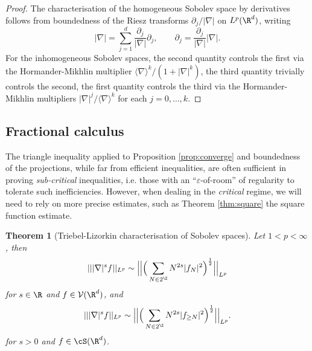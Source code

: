 \documentclass[reqno]{amsart}
\newtheorem{theorem}{Theorem}
\theoremstyle{definition}
\theoremstyle{remark}
\renewcommand{\epsilon}{\varepsilon}
\begin{document}
\begin{proof}
	The characterisation of the homogeneous Sobolev space by derivatives follows from boundedness of the Riesz transforms $\partial_j/|\nabla|$ on $L^p (\R^d)$, writing 
		\[ |\nabla| = \sum_{j = 1}^d \frac{\partial_j}{|\nabla|} \partial_j , \qquad \partial_j = \frac{\partial_j}{|\nabla|} |\nabla|. \]
	For the inhomogeneous Sobolev spaces, the second quantity controls the first via the Hormander-Mikhlin multiplier $\langle \nabla \rangle^k /(1 + |\nabla|^k)$, the third quantity trivially controls the second, the first quantity controls the third via the Hormander-Mikhlin multipliers $|\nabla|^j/\langle \nabla \rangle^k$ for each $j = 0, \dots, k$.  
\end{proof}
\subsection{Fractional calculus}

The triangle inequality applied to Proposition \ref{prop:converge} and boundedness of the projections, while far from efficient inequalities, are often sufficient in proving \textit{sub-critical} inequalities, i.e. those with an ``$\epsilon$-of-room'' of regularity to tolerate such inefficiencies. However, when dealing in the \textit{critical} regime, we will need to rely on more precise estimates, such as Theorem \ref{thm:square} the square function estimate. 


\begin{theorem}[Triebel-Lizorkin characterisation of Sobolev spaces]
	Let $1 < p < \infty$, then 
		\[ || |\nabla|^s f||_{L^p} \sim \Big|\Big| \Big( \sum_{N \in 2^\Z} N^{2s} |f_N|^2 \Big)^\frac12 \Big|\Big|_{L^p} \]
	for $s \in \R$ and $f \in \mathcal V (\R^d)$, and
		\[ || |\nabla|^s f||_{L^p} \sim \Big|\Big| \Big( \sum_{N \in 2^\Z} N^{2s} |f_{\geq N}|^2 \Big)^\frac12 \Big|\Big|_{L^p}. \]	
	for $s > 0$ and $f \in \cS (\R^d)$. 
\end{theorem}
\end{document}
